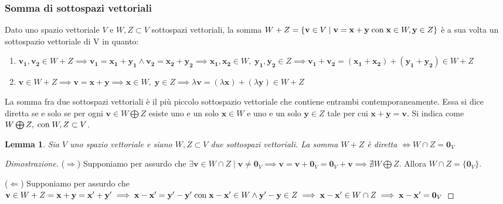 \documentclass{article}
\newtheorem{lemma}{Lemma}
\begin{document}
    \subsubsection{Somma di sottospazi vettoriali}
    Dato uno spazio vettoriale $V$ e $W, Z \subset V$ sottospazi vettoriali, la somma $W + Z = \{\mathbf{v} \in V \; | \; \mathbf{v} = \mathbf{x} + \mathbf{y} \; \textnormal{con} \; \mathbf{x} \in W, \mathbf{y} \in Z\}$ è a sua volta un sottospazio vettoriale di V in quanto:
    \begin{enumerate}[label=(\arabic*)]
        \item $\mathbf{v_1}, \mathbf{v_2} \in W + Z \implies \mathbf{v_1} = \mathbf{x_1} + \mathbf{y_1} \land \mathbf{v_2} = \mathbf{x_2} + \mathbf{y_2} \implies \mathbf{x_1}, \mathbf{x_2} \in W, \; \mathbf{y_1}, \mathbf{y_2} \in Z \implies \mathbf{v_1} + \mathbf{v_2} = (\mathbf{x_1} + \mathbf{x_2}) + (\mathbf{y_1} + \mathbf{y_2}) \in W + Z$
        \item $\mathbf{v} \in W + Z \implies \mathbf{v} = \mathbf{x} + \mathbf{y} \implies \mathbf{x} \in W, \; \mathbf{y} \in Z \implies \lambda \mathbf{v} = (\lambda \mathbf{x}) + (\lambda \mathbf{y}) \in W + Z$
    \end{enumerate}
    La somma fra due sottospazi vettoriali è il più piccolo sottospazio vettoriale che contiene entrambi contemporaneamente. Essa si dice diretta se e solo se per ogni $\mathbf{v} \in W \bigoplus Z$ esiste uno e un solo $\mathbf{x} \in W$ e uno e un solo $\mathbf{y} \in Z$ tale per cui 
    $\mathbf{x} + \mathbf{y} = \mathbf{v}$. Si indica come $W \bigoplus Z, \; \textnormal{con} \; W, Z \subset V$.

    \vspace{10pt}
    \begin{lemma}
        Sia $V$ uno spazio vettoriale e siano $W, Z \subset V$ due sottospazi vettoriali. La somma $W + Z$ è diretta $\iff W \cap Z = {\mathbf{0}_V}$
    \end{lemma}
    \begin{proof}[Dimostrazione]
        ($\Rightarrow$)
        Supponiamo per assurdo che $\exists \mathbf{v} \in W \cap Z \; | \; \mathbf{v} \neq \mathbf{0}_V \implies \mathbf{v} = \mathbf{v} + \mathbf{0}_V = \mathbf{0}_V + \mathbf{v} \implies \nexists W \bigoplus Z$. Allora $W \cap Z = \{\mathbf{0}_V\}$.

        ($\Leftarrow$) 
        Supponiamo per assurdo che $\mathbf{v} \in W + Z = \mathbf{x} + \mathbf{y} = \mathbf{x'} + \mathbf{y'} \implies \mathbf{x} - \mathbf{x'} = \mathbf{y'} - \mathbf{y'} \; \textnormal{con} \; \mathbf{x} - \mathbf{x'} \in W \land \mathbf{y'} - \mathbf{y} \in Z \implies \mathbf{x} - \mathbf{x'} \in W \cap Z \implies \mathbf{x} - \mathbf{x'} = \mathbf{0}_V$
    \end{proof}
\end{document}
